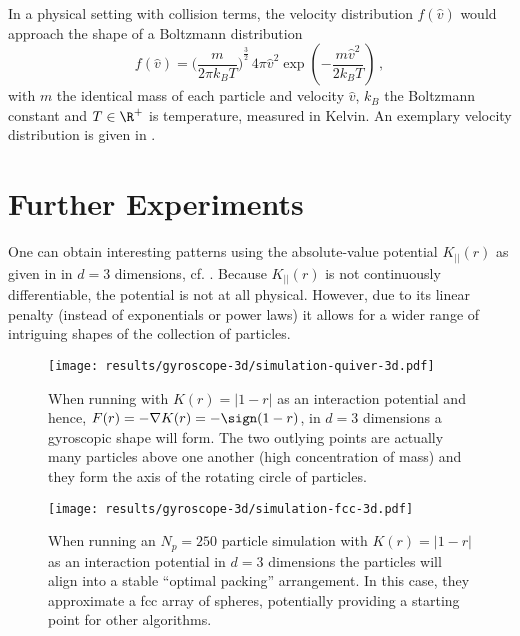 In a physical setting with collision terms, the velocity distribution $f(\hat{v})$ would approach the shape of a Boltzmann distribution
$$f(\hat{v})={\bigg(\frac{m}{2\pi k_B T}\bigg)}^{\frac {3}{2}}\,4\pi \hat{v}^{2}\exp \left(-{\frac {m \hat{v}^{2}}{2k_B T}}\right)\,,$$
with $m$ the identical mass of each particle and velocity $\hat{v}$, $k_B$ the Boltzmann constant and $T \in \R^+$ is temperature, measured in Kelvin.
An exemplary velocity distribution is given in .

\pagebreak

\section{Further Experiments}
One can obtain interesting patterns using the absolute-value potential $K_{||}(r)$ as given in  in $d=3$ dimensions, cf. .
Because $K_{||}(r)$ is not continuously differentiable, the potential is not at all physical.
However, due to its linear penalty (instead of exponentials or power laws) it allows for a wider range of intriguing shapes of the collection of particles.

\begin{figure}[H]
  \centering
  \texttt{[image: results/gyroscope-3d/simulation-quiver-3d.pdf]}
  \caption[Absolute Value Potential 3-dimensional gyroscope visualisation]{When running with $K(r) = |1-r|$ as an interaction potential and hence, $F(r) = -\nabla K(r) = -\sign(1-r)$, in $d=3$ dimensions a gyroscopic shape will form. The two outlying points are actually many particles above one another (high concentration of mass) and they form the axis of the rotating circle of particles.}
  \label{fig:gyroscope-quiver-3d}
\end{figure}

\begin{figure}[H]
  \centering
  \texttt{[image: results/gyroscope-3d/simulation-fcc-3d.pdf]}
  \caption[Absolute Value Potential 3-dimensional sphere packing visualisation]{When running an $N_p = 250$ particle simulation with $K(r) = |1-r|$ as an interaction potential in $d=3$ dimensions the particles will align into a stable ``optimal packing'' arrangement. In this case, they approximate a \gls{fcc} array of spheres, potentially providing a starting point for other algorithms.}
  \label{fig:fcc-quiver-3d}
\end{figure}


